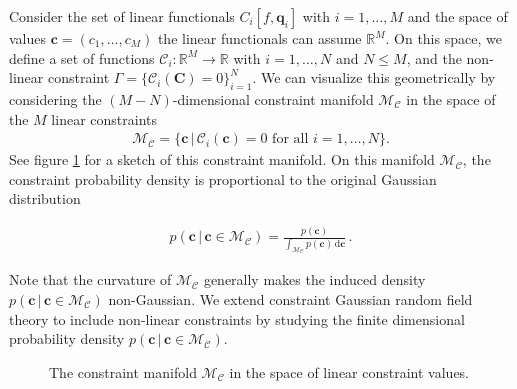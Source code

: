 \documentclass[a4paper, 11pt]{article}
\begin{document}
Consider the set of linear functionals $C_i[f,\bm{q}_i]$ with $i=1,\dots,M$ and the space of values $\bm{c}=(c_1,\dots,c_M)$ the linear functionals can assume $\mathbb{R}^M$. On this space, we define a set of functions $\mathcal{C}_i:\mathbb{R}^M \to \mathbb{R}$ with $i=1,\dots,N$ and $N\leq M$, and the non-linear constraint $\Gamma = \{\mathcal{C}_i(\bm{C}) = 0\}_{i=1}^N$. We can visualize this geometrically by considering the $(M-N)$-dimensional constraint manifold $\mathcal{M}_\mathcal{C}$ in the space of the $M$ linear constraints
\begin{align}
\mathcal{M}_{\mathcal{C}} = 
\{\bm{c}\, |\, \mathcal{C}_i(\bm{c}) = 0 \text{ for all } i=1,\dots,N\}.
\end{align}
See figure \ref{fig:constraintManifold} for a sketch of this constraint manifold. On this manifold $\mathcal{M}_\mathcal{C}$, the constraint probability density is proportional to the original Gaussian distribution
\begin{framed}
\begin{align}
p(\bm{c}\,|\,\bm{c}\in \mathcal{M}_{\mathcal{C}})  = \frac{p(\bm{c})}{\int_{\mathcal{M}_\mathcal{C}} p(\bm{c})\, \mathrm{d}\bm{c}}\,.
\end{align}
\end{framed}
Note that the curvature of $\mathcal{M}_\mathcal{C}$ generally makes the induced density $p(\bm{c}\,|\,\bm{c}\in \mathcal{M}_{\mathcal{C}})$ non-Gaussian. We extend constraint Gaussian random field theory to include non-linear constraints by studying the finite dimensional probability density $p(\bm{c}\,|\,\bm{c}\in \mathcal{M}_{\mathcal{C}})$.



\begin{figure}
\centering
\begin{subfigure}[b]{0.49\textwidth}
\end{subfigure}
\caption{The constraint manifold $\mathcal{M}_\mathcal{C}$ in the space of linear constraint values.}\label{fig:constraintManifold}
\end{figure}
\end{document}
